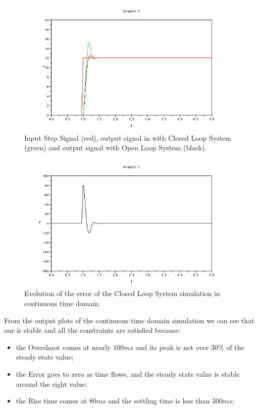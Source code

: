 \begin{figure}[htbp]
  \begin{center}
  \includegraphics[scale=0.5]{FIGURES_2/CLS-Output-Analog.png}
    \caption[Simulation in Continuous time]{Input Step Signal (red), output signal in with Closed Loop System (green) and output signal with Open Loop System (black).}
    \label{fig:analogOutput}
  \end{center}
\end{figure}

\begin{figure}[htbp]
  \begin{center}
  \includegraphics[scale=0.5]{FIGURES_2/CLS-Error-Analog.png}
    \caption[Simulation in Continuous time]{Evolution of the error of the Closed Loop System simulation in continuous time domain.}
    \label{fig:analogError}
  \end{center}
\end{figure}

From the output plots of the continuous time domain simulation we can see that our {\CL} is stable and all the constraints are satisfied because:
\begin{itemize}
	\item the Overshoot comes at nearly $100 ms$ and its peak is not over $30\%$ of the steady state value;
	\item the Error goes to zero as time flows, and the steady state value is stable around the right value;
	\item the Rise time comes at $80 ms$ and the settling time is less than $300 ms$;
\end{itemize}


